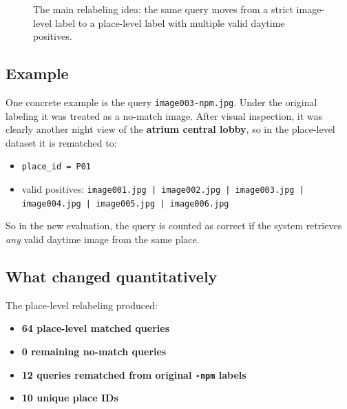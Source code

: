 \documentclass[11pt]{article}
\newcommand{\code}[1]{\texttt{#1}}
\begin{document}
\begin{figure}[H]
\centering
{}
\caption{The main relabeling idea: the same query moves from a strict image-level label to a place-level label with multiple valid daytime positives.}
\end{figure}

\subsection*{Example}
One concrete example is the query \code{image003-npm.jpg}. Under the original labeling it was treated as a no-match image. After visual inspection, it was clearly another night view of the \textbf{atrium central lobby}, so in the place-level dataset it is rematched to:
\begin{itemize}[leftmargin=*]
  \item \code{place\_id = P01}
  \item valid positives:
  \code{image001.jpg | image002.jpg | image003.jpg | image004.jpg | image005.jpg | image006.jpg}
\end{itemize}

So in the new evaluation, the query is counted as correct if the system retrieves \emph{any} valid daytime image from the same place.

\subsection*{What changed quantitatively}
The place-level relabeling produced:
\begin{itemize}[leftmargin=*]
  \item \textbf{64 place-level matched queries}
  \item \textbf{0 remaining no-match queries}
  \item \textbf{12 queries rematched from original \code{-npm} labels}
  \item \textbf{10 unique place IDs}
\end{itemize}
\end{document}

